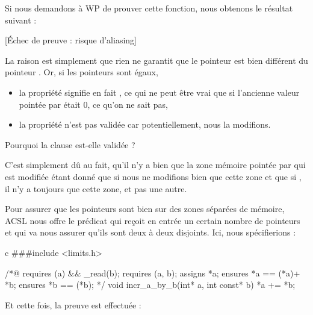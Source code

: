 \documentclass[middle]{zmdocument}
\begin{document}
Si nous demandons à WP de prouver cette fonction, nous obtenons le 
résultat suivant :



[Échec de preuve : risque d'aliasing]


La raison est simplement que rien ne garantit que le pointeur  est bien
différent du pointeur . Or, si les pointeurs sont égaux,



\begin{itemize}
\item la propriété  signifie en fait 
, ce qui ne peut être vrai que si l'ancienne valeur 
pointée par  était 0, ce qu'on ne sait pas,
\item la propriété  n'est pas validée car potentiellement,
nous la modifions.
\end{itemize}


\begin{Question}
Pourquoi la clause  est-elle validée ?

C'est simplement dû au fait, qu'il n'y a bien que la zone mémoire pointée par
 qui est modifiée étant donné que si  nous ne modifions bien 
que cette zone et que si , il n'y a toujours que cette zone, et 
pas une autre.
\end{Question}


Pour assurer que les pointeurs sont bien sur des zones séparées de mémoire, 
ACSL nous offre le prédicat  qui reçoit en entrée 
un certain nombre de pointeurs et qui va nous assurer qu'ils sont deux à deux 
disjoints. Ici, nous spécifierions :



\begin{CodeBlock}{c}
###include <limits.h>

/*@
  requires \valid(a) && \valid_read(b);
  requires \separated(a, b);
  assigns  *a;
  ensures  *a == \old(*a)+ *b;
  ensures  *b == \old(*b);
*/
void incr_a_by_b(int* a, int const* b){
  *a += *b;
}
\end{CodeBlock}



Et cette fois, la preuve est effectuée :
\end{document}
